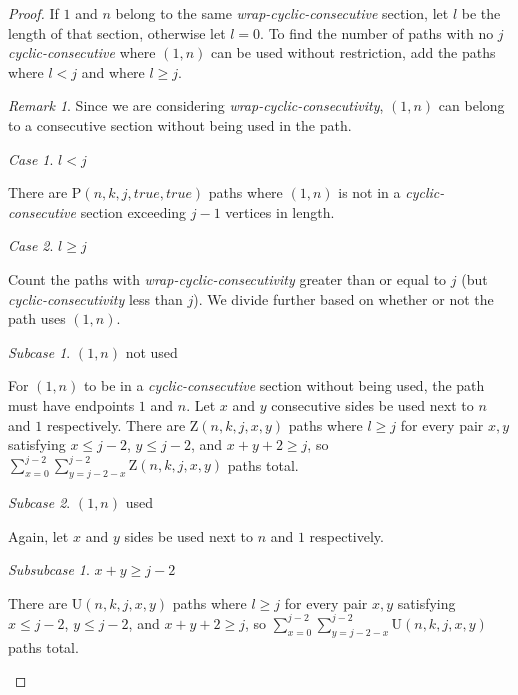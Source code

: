 \documentclass[a4paper, 12pt] {article}
\theoremstyle{remark}
\newtheorem*{remark}{Remark}
\theoremstyle{plain}
\theoremstyle{remark}
\newtheorem{case}{Case}
\newtheorem{subcase}{Subcase}[case]
\newtheorem{subsubcase}{Subsubcase}[subcase]
\begin{document}
\begin{proof}
If $1$ and $n$ belong to the same \textit{wrap-cyclic-consecutive} section, let $l$ be the length of that section, otherwise let $l=0$. To find the number of paths with no $j$ \textit{cyclic-consecutive} where $(1,n)$ can be used without restriction, add the paths where $l<j$ and where $l \geq j$.

\begin{remark}
Since we are considering \textit{wrap-cyclic-consecutivity}, $(1,n)$ can belong to a consecutive section without being used in the path.
\end{remark}

\begin{case} $l<j$

There are $\mathrm{P}(n,k,j,true,true)$ paths where $(1,n)$ is not in a \textit{cyclic-consec\-utive} section exceeding $j-1$ vertices in length.
\end{case}

\begin{case} $l \geq j$

Count the paths with \textit{wrap-cyclic-consecutivity} greater than or equal to $j$ (but \textit{cyclic-consecutivity} less than $j$). We divide further based on whether or not the path uses $(1,n)$.

\begin{subcase} $(1,n)$ not used

For $(1,n)$ to be in a \textit{cyclic-consecutive} section without being used, the path must have endpoints $1$ and $n$. Let $x$ and $y$ consecutive sides be used next to $n$ and $1$ respectively. There are $\mathrm{Z}(n,k,j,x,y)$ paths where $l \geq j$ for every pair $x, y$ satisfying $x \leq j-2$, $y \leq j-2$, and $x+y+2 \geq j$, so $\sum_{x=0}^{j-2} \sum_{y=j-2-x}^{j-2} \mathrm{Z}(n,k,j,x,y)$ paths total.
\end{subcase}

\begin{subcase} $(1,n)$ used

Again, let $x$ and $y$ sides be used next to $n$ and $1$ respectively.

\begin{subsubcase} $x+y \geq j-2$

There are $\mathrm{U}(n,k,j,x,y)$ paths where $l \geq j$ for every pair $x, y$ satisfying $x \leq j-2$, $y \leq j-2$, and $x+y+2 \geq j$, so $\sum_{x=0}^{j-2} \sum_{y=j-2-x}^{j-2} \mathrm{U}(n,k,j,x,y)$ paths total.
\end{subsubcase}


\end{subcase}
\end{case}
\end{proof}
\end{document}
